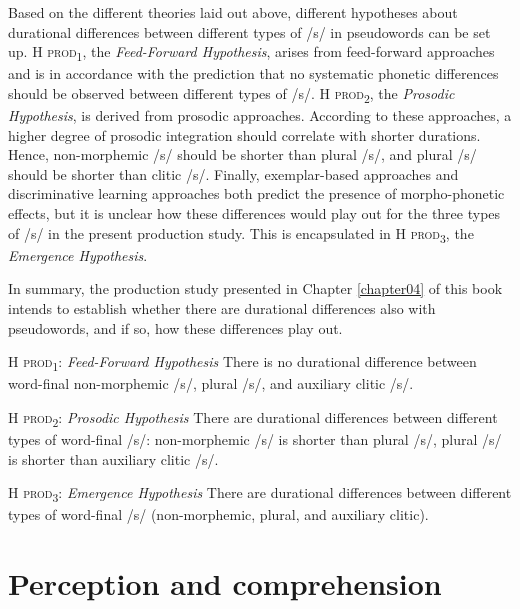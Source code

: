 Based on the different theories laid out above, different hypotheses about durational differences between different types of /s/ in pseudowords can be set up. \textsc{H prod\textsubscript{1}}, the \textit{Feed-Forward Hypothesis}, arises from feed-forward approaches and is in accordance with the prediction that no systematic phonetic differences should be observed between different types of /s/. \textsc{H prod\textsubscript{2}}, the \textit{Prosodic Hypothesis}, is derived from prosodic approaches. According to these approaches, a higher degree of prosodic integration should correlate with shorter durations. Hence, non-morphemic /s/ should be shorter than plural /s/, and plural /s/ should be shorter than clitic /s/. Finally, exemplar-based approaches and discriminative learning approaches both predict the presence of morpho-phonetic effects, but it is unclear how these differences would play out for the three types of /s/ in the present production study. This is encapsulated in \textsc{H prod\textsubscript{3}}, the \textit{Emergence Hypothesis}. 

In summary, the production study presented in Chapter \ref{chapter04} of this book intends to establish whether there are durational differences also with pseudowords, and if so, how these differences play out.

\begin{description}
\item\textsc{H prod\textsubscript{1}}: \textit{Feed-Forward Hypothesis} \newline
There is no durational difference between word-final non-morphemic /s/, plural /s/, and auxiliary clitic /s/.

\item\textsc{H prod\textsubscript{2}}: \textit{Prosodic Hypothesis} \newline
There are durational differences between different types of word-final /s/: 
non-morphemic /s/ is shorter than plural /s/, plural /s/ is shorter than auxiliary clitic /s/.

\item\textsc{H prod\textsubscript{3}}: \textit{Emergence Hypothesis} \newline
There are durational differences between different types of word-final /s/ (non-morphemic, plural, and auxiliary clitic).
\end{description}

\section{Perception and comprehension}\label{section02_2}

